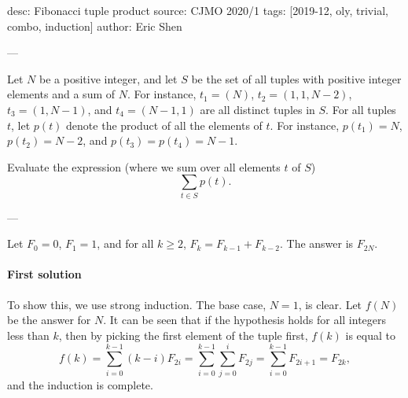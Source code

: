 desc: Fibonacci tuple product
source: CJMO 2020/1
tags: [2019-12, oly, trivial, combo, induction]
author: Eric Shen

---

Let $N$ be a positive integer, and let $S$ be the set of all tuples with positive integer elements and a sum of $N$. For instance, $t_1=(N)$, $t_2=(1,1,N-2)$, $t_3=(1,N-1)$, and $t_4=(N-1,1)$ are all distinct tuples in $S$. For all tuples $t$, let $p(t)$ denote the product of all the elements of $t$. For instance, $p(t_1)=N$, $p(t_2)=N-2$, and $p(t_3)=p(t_4)=N-1$.

Evaluate the expression (where we sum over all elements $t$ of $S$) \[\sum_{t\in S}p(t).\]

---

Let $F_0=0$, $F_1=1$, and for all $k\ge 2$, $F_k=F_{k-1}+F_{k-2}$. The answer is $F_{2N}$.

\paragraph{First solution}     To show this, we use strong induction. The base case, $N=1$, is clear. Let $f(N)$ be the answer for $N$. It can be seen that if the hypothesis holds for all integers less than $k$, then by picking the first element of the tuple first, $f(k)$ is equal to \[f(k)=\sum_{i=0}^{k-1} (k-i)F_{2i}=\sum_{i=0}^{k-1}\sum_{j=0}^i F_{2j}=\sum_{i=0}^{k-1} F_{2i+1}=F_{2k},\]
    and the induction is complete.

